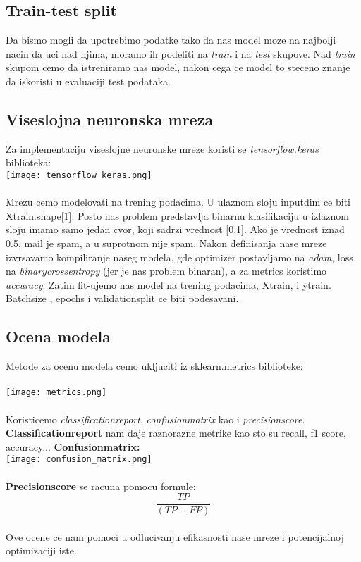 \documentclass{article}
\begin{document}
\subsection{Train-test split}
Da bismo mogli da upotrebimo podatke tako da nas model moze na najbolji nacin da uci nad njima, moramo ih podeliti na \textit{train} i na \textit{test} skupove. Nad \textit{train} skupom cemo da istreniramo nas model, nakon cega ce model to steceno znanje da iskoristi u evaluaciji test podataka.\\


\subsection{Viseslojna neuronska mreza}
Za implementaciju viseslojne neuronske mreze koristi se \textit{tensorflow.keras} biblioteka: \\

\texttt{[image: tensorflow\_keras.png]}\\
\\
Mrezu cemo modelovati na trening podacima. U ulaznom sloju input\textunderscore dim ce biti X\textunderscore train.shape[1]. Posto nas problem predstavlja binarnu klasifikaciju u izlaznom sloju imamo samo jedan cvor, koji sadrzi vrednost [0,1]. Ako je vrednost iznad 0.5, mail je spam, a u suprotnom nije spam. Nakon definisanja nase mreze izvrsavamo kompiliranje naseg modela, gde optimizer postavljamo na \textit{adam}, loss na \textit{binary\textunderscore crossentropy} (jer je nas problem binaran), a za metrics koristimo \textit{accuracy}. Zatim fit-ujemo nas model na trening podacima, X\textunderscore train, i y\textunderscore train. Batch\textunderscore size , epochs i validation\textunderscore split ce biti podesavani.


\newpage
\subsection{Ocena modela}
Metode za ocenu modela cemo ukljuciti iz sklearn.metrics biblioteke:\\
\\
\texttt{[image: metrics.png]}\\
\\
Koristicemo \textit{classification\textunderscore report}, \textit{confusion\textunderscore matrix} kao i \textit{precision\textunderscore score}. \\
\textbf{Classification\textunderscore report} nam daje raznorazne metrike kao sto su recall, f1 score, accuracy...
\textbf{Confusion\textunderscore matrix:}\\
\texttt{[image: confusion\_matrix.png]}\\
\\
\textbf{Precision\textunderscore score} se racuna pomocu formule:\\
$$\frac{TP}{(TP + FP)}$$ \\
Ove ocene ce nam pomoci u odlucivanju efikasnosti nase mreze i potencijalnoj optimizaciji iste.
\end{document}
